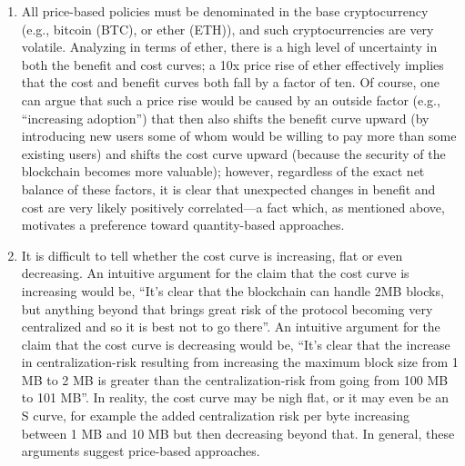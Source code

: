 \documentclass[12pt, final]{article}
\begin{document}
\begin{enumerate}
\item All price-based policies must be denominated in the base cryptocurrency (e.g., bitcoin (BTC), or ether (ETH)), and such cryptocurrencies are very volatile. Analyzing in terms of ether, there is a high level of uncertainty in both the benefit and cost curves; a 10x price rise of ether effectively implies that the cost and benefit curves both fall by a factor of ten. Of course, one can argue that such a price rise would be caused by an outside factor (e.g., ``increasing adoption'') that then also shifts the benefit curve upward (by introducing new users some of whom would be willing to pay more than some existing users) and shifts the cost curve upward (because the security of the blockchain becomes more valuable); however, regardless of the exact net balance of these factors, it is clear that unexpected changes in benefit and cost are very likely positively correlated---a fact which, as mentioned above, motivates a preference toward quantity-based approaches.

\item It is difficult to tell whether the cost curve is increasing, flat or even decreasing.
An intuitive argument for the claim that the cost curve is increasing would be, ``It's clear that the blockchain can handle 2MB blocks, but anything beyond that brings great risk of the protocol becoming very centralized and so it is best not to go there''. An intuitive argument for the claim that the cost curve is decreasing would be, ``It's clear that the increase in centralization-risk resulting from increasing the maximum block size from 1 MB to 2 MB is greater than the centralization-risk from going from 100 MB to 101 MB''. In reality, the cost curve may be nigh flat, or it may even be an S curve, for example the added centralization risk per byte increasing between 1 MB and 10 MB but then decreasing beyond that. In general, these arguments suggest price-based approaches.


\end{enumerate}
\end{document}

